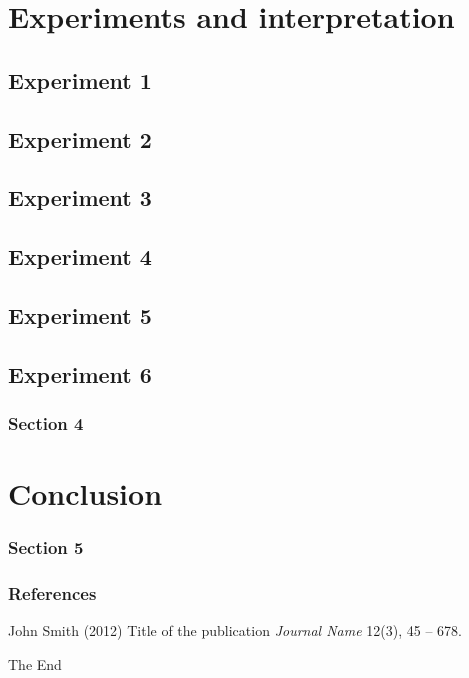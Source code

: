\documentclass{beamer}
\begin{document}
\section{Experiments and interpretation} 

\subsection{Experiment 1} 
\subsection{Experiment 2} 
\subsection{Experiment 3} 
\subsection{Experiment 4} 
\subsection{Experiment 5} 
\subsection{Experiment 6} 
\begin{frame}
\frametitle{Section 4}
\end{frame}

\section{Conclusion} 

\begin{frame}
\frametitle{Section 5}
\end{frame}



\begin{frame}
\frametitle{References}
\footnotesize{
\begin{thebibliography}{99} %
 John Smith (2012)
\newblock Title of the publication
\newblock \emph{Journal Name} 12(3), 45 -- 678.
\end{thebibliography}
}
\end{frame}


\begin{frame}
\Huge{\centerline{The End}}
\end{frame}

\end{document}
